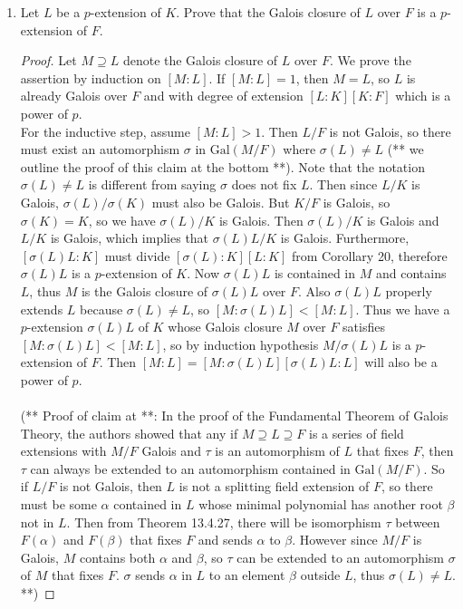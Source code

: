 \documentclass{article}
\begin{document}
  \begin{enumerate}[label={(\alph*)}]
    \item Let $L$ be a $p$-extension of $K$. Prove that the Galois closure
      of $L$ over $F$ is a $p$-extension of $F$.

      \begin{proof}
        Let $M\supseteq L$ denote the Galois closure of $L$ over $F$. We
        prove the assertion by induction on $[M:L]$. If $[M:L]=1$, then
        $M=L$, so $L$ is already Galois over $F$ and with degree of
        extension $[L:K][K:F]$ which is a power of $p$. \\

        For the inductive step, assume $[M:L]>1$. Then $L/F$ is not Galois,
        so there must exist an automorphism $\sigma$ in $\text{Gal}(M/F)$
        where $\sigma(L)\neq L$ (** we outline the proof of this claim at
        the bottom **). Note that the notation $\sigma(L)\neq L$ is
        different from saying $\sigma$ does not fix $L$. Then since $L/K$ is
        Galois, $\sigma(L)/\sigma(K)$ must also be Galois. But $K/F$ is
        Galois, so $\sigma(K)=K$, so we have $\sigma(L)/K$ is Galois. Then
        $\sigma(L)/K$ is Galois and $L/K$ is Galois, which implies that
        $\sigma(L)L/K$ is Galois.  Furthermore, $[\sigma(L)L:K]$ must
        divide $[\sigma(L):K][L:K]$ from Corollary 20, therefore
        $\sigma(L)L$ is a $p$-extension of $K$.  Now $\sigma(L)L$ is
        contained in $M$ and contains $L$, thus $M$ is the Galois closure
        of $\sigma(L)L$ over $F$. Also $\sigma(L)L$ properly extends $L$
        because $\sigma(L)\neq L$, so $[M:\sigma(L)L]<[M:L]$. Thus we have
        a $p$-extension $\sigma(L)L$ of $K$ whose Galois closure $M$ over
        $F$ satisfies $[M:\sigma(L)L]<[M:L]$, so by induction hypothesis
        $M/\sigma(L)L$ is a $p$-extension of $F$. Then $[M:L]
        =[M:\sigma(L)L][\sigma(L)L:L]$ will also be a power of $p$. \\\\

        (** Proof of claim at **: In the proof of the Fundamental Theorem
        of Galois Theory, the authors showed that any if $M\supseteq
        L\supseteq F$ is a series of field extensions with $M/F$ Galois and
        $\tau$ is an automorphism of $L$ that fixes $F$, then $\tau$ can
        always be extended to an automorphism contained in
        $\text{Gal}(M/F)$. So if $L/F$ is not Galois, then $L$ is not a
        splitting field extension of $F$, so there must be some $\alpha$
        contained in $L$ whose minimal polynomial has another root $\beta$
        not in $L$. Then from Theorem 13.4.27, there will be isomorphism
        $\tau$ between $F(\alpha)$ and $F(\beta)$ that fixes $F$ and sends
        $\alpha$ to $\beta$. However since $M/F$ is Galois, $M$ contains
        both $\alpha$ and $\beta$, so $\tau$ can be extended to an
        automorphism $\sigma$ of $M$ that fixes $F$. $\sigma$ sends
        $\alpha$ in $L$ to an element $\beta$ outside $L$, thus
        $\sigma(L)\neq L$. **)
      \end{proof}


\end{enumerate}
\end{document}
